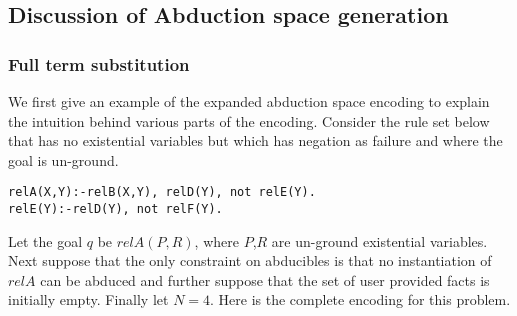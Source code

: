 \subsection{Discussion of Abduction space generation}

\subsubsection{Full term substitution}
We first give an example of the expanded abduction space encoding to explain
the intuition behind various parts of the encoding. Consider the rule set
below that has no existential variables but which has negation as failure and
where the goal is un-ground.
\begin{lstlisting}[frame=none]
relA(X,Y):-relB(X,Y), relD(Y), not relE(Y).
relE(Y):-relD(Y), not relF(Y).
\end{lstlisting}
Let the goal $q$ be $relA(P,R)$, where $P$,$R$ are un-ground existential
variables. Next suppose that the only constraint on abducibles is that no
instantiation of $relA$ can be abduced and further suppose that the set of
user provided facts is initially empty. Finally let $N=4$. Here is the
complete encoding for this problem.

